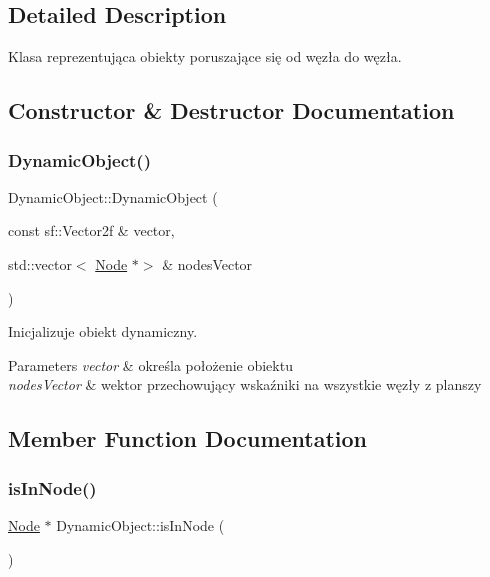 \subsection{Detailed Description}
Klasa reprezentująca obiekty poruszające się od węzła do węzła. 

\subsection{Constructor \& Destructor Documentation}
\mbox{\label{classDynamicObject_a5e007abd09c1a213c913ec0dbf11be7a}} 
\subsubsection{\texorpdfstring{Dynamic\+Object()}{DynamicObject()}}
{\footnotesize\ttfamily Dynamic\+Object\+::\+Dynamic\+Object (\begin{DoxyParamCaption}\item[{const sf\+::\+Vector2f \&}]{vector,  }\item[{std\+::vector$<$ \hyperlink{classNode}{Node} $\ast$$>$ \&}]{nodes\+Vector }\end{DoxyParamCaption})\hspace{0.3cm}{\ttfamily [protected]}}



Inicjalizuje obiekt dynamiczny. 


\begin{DoxyParams}{Parameters}
{\em vector} & określa położenie obiektu \\
\hline
{\em nodes\+Vector} & wektor przechowujący wskaźniki na wszystkie węzły z planszy \\
\hline
\end{DoxyParams}


\subsection{Member Function Documentation}
\mbox{\label{classDynamicObject_af121dbd6d880bf772494ae251e272693}} 
\subsubsection{\texorpdfstring{is\+In\+Node()}{isInNode()}}
{\footnotesize\ttfamily \hyperlink{classNode}{Node} $\ast$ Dynamic\+Object\+::is\+In\+Node (\begin{DoxyParamCaption}{ }\end{DoxyParamCaption})\hspace{0.3cm}{\ttfamily [protected]}}




